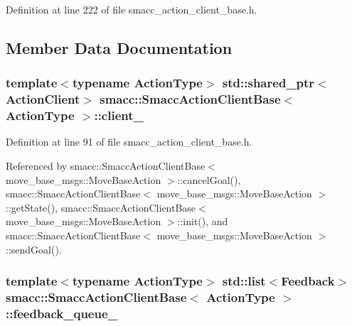 Definition at line 222 of file smacc\+\_\+action\+\_\+client\+\_\+base.\+h.



\subsection{Member Data Documentation}
\subsubsection[{\texorpdfstring{client\+\_\+}{client_}}]{\setlength{\rightskip}{0pt plus 5cm}template$<$typename Action\+Type$>$ std\+::shared\+\_\+ptr$<${\bf Action\+Client}$>$ {\bf smacc\+::\+Smacc\+Action\+Client\+Base}$<$ Action\+Type $>$\+::client\+\_\+\hspace{0.3cm}{\ttfamily [protected]}}\hypertarget{classsmacc_1_1SmaccActionClientBase_a10d3b707b855c6d360aeeb35e50cd0c7}{}\label{classsmacc_1_1SmaccActionClientBase_a10d3b707b855c6d360aeeb35e50cd0c7}


Definition at line 91 of file smacc\+\_\+action\+\_\+client\+\_\+base.\+h.



Referenced by smacc\+::\+Smacc\+Action\+Client\+Base$<$ move\+\_\+base\+\_\+msgs\+::\+Move\+Base\+Action $>$\+::cancel\+Goal(), smacc\+::\+Smacc\+Action\+Client\+Base$<$ move\+\_\+base\+\_\+msgs\+::\+Move\+Base\+Action $>$\+::get\+State(), smacc\+::\+Smacc\+Action\+Client\+Base$<$ move\+\_\+base\+\_\+msgs\+::\+Move\+Base\+Action $>$\+::init(), and smacc\+::\+Smacc\+Action\+Client\+Base$<$ move\+\_\+base\+\_\+msgs\+::\+Move\+Base\+Action $>$\+::send\+Goal().

\subsubsection[{\texorpdfstring{feedback\+\_\+queue\+\_\+}{feedback_queue_}}]{\setlength{\rightskip}{0pt plus 5cm}template$<$typename Action\+Type$>$ std\+::list$<$Feedback$>$ {\bf smacc\+::\+Smacc\+Action\+Client\+Base}$<$ Action\+Type $>$\+::feedback\+\_\+queue\+\_\+\hspace{0.3cm}{\ttfamily [protected]}}\hypertarget{classsmacc_1_1SmaccActionClientBase_a66fe8948b906b832b06b5dae469d8dc4}{}\label{classsmacc_1_1SmaccActionClientBase_a66fe8948b906b832b06b5dae469d8dc4}


